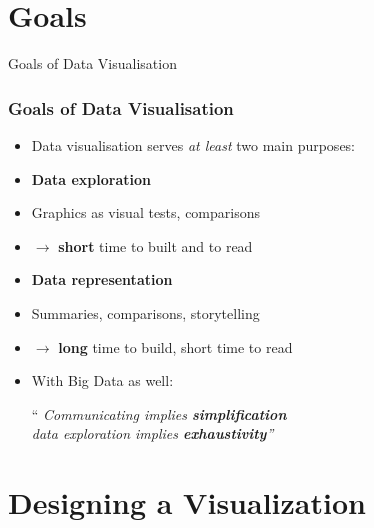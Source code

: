 \documentclass[xcolor=x11names,compress, aspectratio=169]{beamer}
\renewcommand{\(}{\begin{columns}}
\renewcommand{\)}{\end{columns}}
\newcommand{\<}[1]{\begin{column}{#1}}
\renewcommand{\>}{\end{column}}
\begin{document}
\section{Goals}

{

\begin{frame}
\hspace{4cm}
\begin{center}
\Huge{Goals of Data Visualisation}
\end{center}
\end{frame}

} %



\begin{frame}
\frametitle{Goals of Data Visualisation}

\begin{itemize}
    \item<+->[]  Data visualisation serves \textit{at least} two main purposes:
    \item<+-> \textcolor{siap}{\textbf{Data exploration}} \\
    \item<+->[] Graphics as visual tests, \textcolor{brique}{comparisons}
   \item<+->[] $\rightarrow$ \textbf{short} time to built and to read
    \item<+-> \textcolor{siap}{\textbf{Data representation}}\\
    \item<+->[] Summaries, \textcolor{brique}{comparisons}, storytelling
     \item<+->[] $\rightarrow$ \textbf{long} time to build, short time to read
     \item<+->[] With Big Data as well:\\
\begin{center}
`` \emph{Communicating  implies \textbf{simplification} \\
data exploration implies \textbf{exhaustivity}''}
\end{center}
\end{itemize}
\end{frame}

\section{Designing a Visualization }
\end{document}
